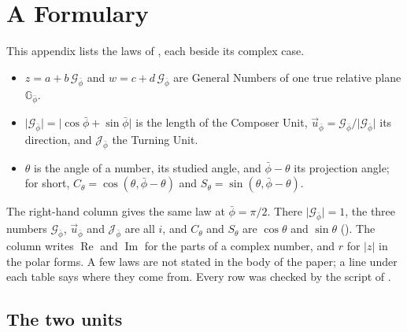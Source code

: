 \documentclass[11pt,a4paper]{amsart}
\theoremstyle{plain}
\theoremstyle{definition}
\theoremstyle{remark}
\newcommand{\pb}{\bar{\phi}}                     %
\newcommand{\Gp}{\mathcal{G}_{\bar{\phi}}}       %
\newcommand{\up}{\vec{u}_{\bar{\phi}}}           %
\newcommand{\Jp}{\mathcal{J}_{\bar{\phi}}}       %
\newcommand{\GNp}{\mathbb{G}_{\bar{\phi}}}       %
\begin{document}
\appendix
\section{A Formulary}\label{app:formulary}

This appendix lists the laws of , each beside its complex case.
\begin{itemize}[leftmargin=*]
  \item $z = a + b\,\Gp$ and $w = c + d\,\Gp$ are General Numbers of one true relative plane $\GNp$.
  \item $\lvert\Gp\rvert = \lvert\cos\pb + \sin\pb\rvert$ is the length of the Composer Unit, $\up = \Gp/\lvert\Gp\rvert$ its direction, and $\Jp$ the Turning Unit.
  \item $\theta$ is the angle of a number, its studied angle, and $\pb - \theta$ its projection angle; for short, $C_\theta = \cos(\theta, \pb - \theta)$ and $S_\theta = \sin(\theta, \pb - \theta)$.
\end{itemize}
The right-hand column gives the same law at $\pb = \pi/2$. There $\lvert\Gp\rvert = 1$, the three numbers $\Gp$, $\up$ and $\Jp$ are all $i$, and $C_\theta$ and $S_\theta$ are $\cos\theta$ and $\sin\theta$ (). The column writes $\operatorname{Re}$ and $\operatorname{Im}$ for the parts of a complex number, and $r$ for $\lvert z\rvert$ in the polar forms. A few laws are not stated in the body of the paper; a line under each table says where they come from. Every row was checked by the script of .

\subsection{The two units}\label{app:units}
\end{document}
